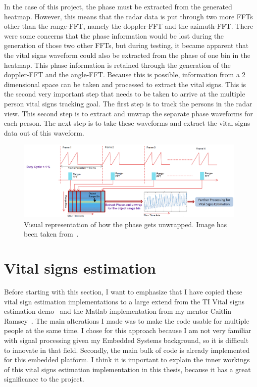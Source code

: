 In the case of this project, the phase must be extracted from the generated heatmap. However, this means that the radar data is put through two more FFTs other than the range-FFT, namely the doppler-FFT and the azimuth-FFT. There were some concerns that the phase information would be lost during the generation of those two other FFTs, but during testing, it became apparent that the vital signs waveform could also be extracted from the phase of one bin in the heatmap. This phase information is retained through the generation of the doppler-FFT and the angle-FFT. Because this is possible, information from a 2 dimensional space can be taken and processed to extract the vital signs. This is the second very important step that needs to be taken to arrive at the multiple person vital signs tracking goal. The first step is to track the persons in the radar view. This second step is to extract and unwrap the separate phase waveforms for each person. The next step is to take these waveforms and extract the vital signs data out of this waveform.

\begin{figure}[t]
\centering
\includegraphics[width=.95\textwidth]{figures/measuring_vital_signs/phase_unwrapping.png}
\caption{Visual representation of how the phase gets unwrapped. Image has been taken from~\cite{vital_signs_lab_website}.}
\label{fig:phase_unwrapping}
\end{figure}

\section{Vital signs estimation}
\label{sec:vit_signs_est}
Before starting with this section, I want to emphasize that I have copied these vital sign estimation implementations to a large extend from the TI Vital signs estimation demo~\cite{vital_signs_lab_website} and the Matlab implementation from my mentor Caitlin Ramsey~\cite{caitlin_msc_thesis_2020}. The main alterations I made was to make the code usable for multiple people at the same time. I chose for this approach because I am not very familiar with signal processing given my Embedded Systems background, so it is difficult to innovate in that field. Secondly, the main bulk of code is already implemented for this embedded platform. I think it is important to explain the inner workings of this vital signs estimation implementation in this thesis, because it has a great significance to the project.


